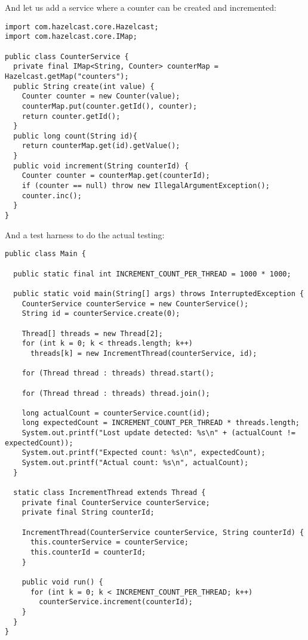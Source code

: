 And let us add a service where a counter can be created and incremented:

\begin{verbatim}
import com.hazelcast.core.Hazelcast;
import com.hazelcast.core.IMap;

public class CounterService {
  private final IMap<String, Counter> counterMap = Hazelcast.getMap("counters");
  public String create(int value) {
    Counter counter = new Counter(value);
    counterMap.put(counter.getId(), counter);
    return counter.getId();
  }
  public long count(String id){
    return counterMap.get(id).getValue();
  }
  public void increment(String counterId) {
    Counter counter = counterMap.get(counterId);
    if (counter == null) throw new IllegalArgumentException();
    counter.inc();
  }
}
\end{verbatim}

And a test harness to do the actual testing:

\begin{verbatim}
public class Main {

  public static final int INCREMENT_COUNT_PER_THREAD = 1000 * 1000;

  public static void main(String[] args) throws InterruptedException {
    CounterService counterService = new CounterService();
    String id = counterService.create(0);

    Thread[] threads = new Thread[2];
    for (int k = 0; k < threads.length; k++)
      threads[k] = new IncrementThread(counterService, id);

    for (Thread thread : threads) thread.start();

    for (Thread thread : threads) thread.join();

    long actualCount = counterService.count(id);
    long expectedCount = INCREMENT_COUNT_PER_THREAD * threads.length;
    System.out.printf("Lost update detected: %s\n" + (actualCount != expectedCount));
    System.out.printf("Expected count: %s\n", expectedCount);
    System.out.printf("Actual count: %s\n", actualCount);
  }

  static class IncrementThread extends Thread {
    private final CounterService counterService;
    private final String counterId;

    IncrementThread(CounterService counterService, String counterId) {
      this.counterService = counterService;
      this.counterId = counterId;
    }

    public void run() {
      for (int k = 0; k < INCREMENT_COUNT_PER_THREAD; k++)
        counterService.increment(counterId);
    }
  }
}
\end{verbatim}

